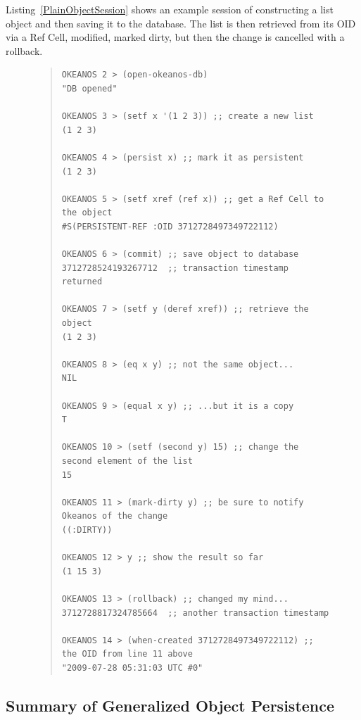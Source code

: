 \documentclass[article,oneside]{memoir}
\begin{document}
Listing~\ref{PlainObjectSession} shows an example session of constructing a list object and then saving it to the database. The list is then retrieved from its OID via a Ref Cell, modified, marked dirty, but then the change is cancelled with a rollback.

\begin{figure}[!htbp]
\begin{quote}
\lstset{language=Lisp,caption=Sample Okeanos session with plain objects,label=PlainObjectSession}
\begin{lstlisting}
OKEANOS 2 > (open-okeanos-db)
"DB opened"

OKEANOS 3 > (setf x '(1 2 3)) ;; create a new list
(1 2 3)

OKEANOS 4 > (persist x) ;; mark it as persistent
(1 2 3)

OKEANOS 5 > (setf xref (ref x)) ;; get a Ref Cell to the object
#S(PERSISTENT-REF :OID 3712728497349722112)

OKEANOS 6 > (commit) ;; save object to database
3712728524193267712  ;; transaction timestamp returned

OKEANOS 7 > (setf y (deref xref)) ;; retrieve the object
(1 2 3)

OKEANOS 8 > (eq x y) ;; not the same object...
NIL

OKEANOS 9 > (equal x y) ;; ...but it is a copy
T

OKEANOS 10 > (setf (second y) 15) ;; change the second element of the list
15

OKEANOS 11 > (mark-dirty y) ;; be sure to notify Okeanos of the change
((:DIRTY))

OKEANOS 12 > y ;; show the result so far
(1 15 3)

OKEANOS 13 > (rollback) ;; changed my mind...
3712728817324785664  ;; another transaction timestamp

OKEANOS 14 > (when-created 3712728497349722112) ;; the OID from line 11 above
"2009-07-28 05:31:03 UTC #0"
\end{lstlisting}
\end{quote}
\end{figure}


\subsection{Summary of Generalized Object Persistence}
\end{document}
